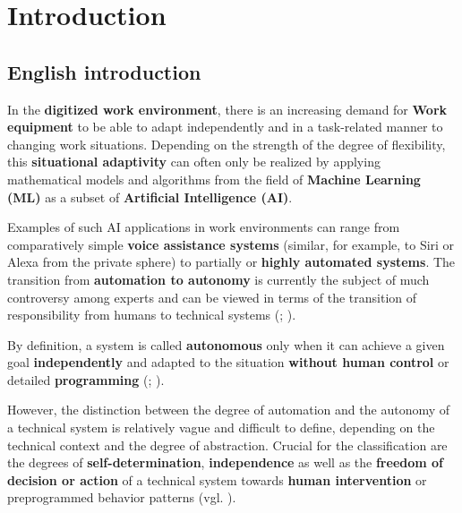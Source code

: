 \documentclass [oneside,10pt,a4paper,ngerman,BCOR10mm,headsepline,parindent,final]{scrartcl}
\begin{document}
    \renewcommand{\sectionmark}[1]{
        \markboth{\thesection{} #1}{}
    }

    
    \tableofcontents
    
    


    
    \hypertarget{introduction}{%
\section{Introduction}\label{introduction}}

    \hypertarget{english-introduction}{%
\subsection{English introduction}\label{english-introduction}}

In the \textbf{digitized work environment}, there is an increasing
demand for \textbf{Work equipment} to be able to adapt independently and
in a task-related manner to changing work situations. Depending on the
strength of the degree of flexibility, this \textbf{situational
adaptivity} can often only be realized by applying mathematical models
and algorithms from the field of \textbf{Machine Learning (ML)} as a
subset of \textbf{Artificial Intelligence (AI)}.

Examples of such AI applications in work environments can range from
comparatively simple \textbf{voice assistance systems} (similar, for
example, to Siri or Alexa from the private sphere) to partially or
\textbf{highly automated systems}. The transition from
\textbf{automation to autonomy} is currently the subject of much
controversy among experts and can be viewed in terms of the transition
of responsibility from humans to technical systems (\cite{Adler_2021};
\cite{Adler_2019}).

By definition, a system is called \textbf{autonomous} only when it can
achieve a given goal \textbf{independently} and adapted to the situation
\textbf{without human control} or detailed \textbf{programming}
(\cite{EFI_autSysteme_2018}; \cite{acatech_2017}).

However, the distinction between the degree of automation and the
autonomy of a technical system is relatively vague and difficult to
define, depending on the technical context and the degree of
abstraction. Crucial for the classification are the degrees of
\textbf{self-determination}, \textbf{independence} as well as the
\textbf{freedom of decision or action} of a technical system towards
\textbf{human intervention} or preprogrammed behavior patterns (vgl.
\cite{Wiki_Autonomie}).
\end{document}
